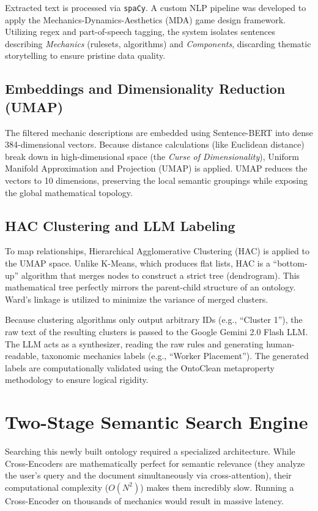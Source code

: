 \documentclass{article}
\begin{document}
Extracted text is processed via \texttt{spaCy}. A custom NLP pipeline was developed to apply the Mechanics-Dynamics-Aesthetics (MDA) game design framework. Utilizing regex and part-of-speech tagging, the system isolates sentences describing \emph{Mechanics} (rulesets, algorithms) and \emph{Components}, discarding thematic storytelling to ensure pristine data quality.

\subsection{Embeddings and Dimensionality Reduction (UMAP)}
The filtered mechanic descriptions are embedded using Sentence-BERT into dense 384-dimensional vectors. Because distance calculations (like Euclidean distance) break down in high-dimensional space (the \emph{Curse of Dimensionality}), Uniform Manifold Approximation and Projection (UMAP) is applied. UMAP reduces the vectors to 10 dimensions, preserving the local semantic groupings while exposing the global mathematical topology.

\subsection{HAC Clustering and LLM Labeling}
To map relationships, Hierarchical Agglomerative Clustering (HAC) is applied to the UMAP space. Unlike K-Means, which produces flat lists, HAC is a ``bottom-up'' algorithm that merges nodes to construct a strict tree (dendrogram). This mathematical tree perfectly mirrors the parent-child structure of an ontology. Ward's linkage is utilized to minimize the variance of merged clusters.

Because clustering algorithms only output arbitrary IDs (e.g., ``Cluster 1''), the raw text of the resulting clusters is passed to the Google Gemini 2.0 Flash LLM. The LLM acts as a synthesizer, reading the raw rules and generating human-readable, taxonomic mechanics labels (e.g., ``Worker Placement''). The generated labels are computationally validated using the OntoClean metaproperty methodology to ensure logical rigidity.

\section{Two-Stage Semantic Search Engine}
\label{sec:search}
Searching this newly built ontology required a specialized architecture. While Cross-Encoders are mathematically perfect for semantic relevance (they analyze the user's query and the document simultaneously via cross-attention), their computational complexity ($O(N^2)$) makes them incredibly slow. Running a Cross-Encoder on thousands of mechanics would result in massive latency. 
\end{document}
